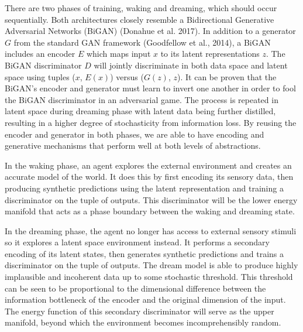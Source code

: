 \documentclass{article}
\begin{document}
There are two phases of training, waking and dreaming, which should occur sequentially. Both architectures closely resemble a Bidirectional Generative Adversarial Networks (BiGAN) (Donahue et al. 2017). In addition to a generator $G$ from the standard GAN framework (Goodfellow et al., 2014), a BiGAN includes an encoder $E$ which maps input $x$ to its latent representations $z$. The BiGAN discriminator $D$  will jointly discriminate in both data space and latent space using tuples ($x$, $E(x)$) versus ($G(z)$, $z$). It can be proven that the BiGAN's encoder and generator must learn to invert one another in order to fool the BiGAN discriminator in an adversarial game. The process is repeated in latent space during dreaming phase with latent data being further distilled, resulting in a higher degree of stochasticity from information loss. By reusing the encoder and generator in both phases, we are able to have encoding and generative mechanisms that perform well at both levels of abstractions. 

In the waking phase, an agent explores the external environment and creates an accurate model of the world. It does this by first encoding its sensory data, then producing synthetic predictions using the latent representation and training a discriminator on the tuple of outputs. This discriminator will be the lower energy manifold that acts as a phase boundary between the waking and dreaming state. 

In the dreaming phase, the agent no longer has access to external sensory stimuli so it explores a latent space environment instead. It performs a secondary encoding of its latent states, then generates synthetic predictions and trains a discriminator on the tuple of outputs. The dream model is able to produce highly implausible and incoherent data up to some stochastic threshold. This threshold can be seen to be proportional to the dimensional difference between the information bottleneck of the encoder and the original dimension of the input. The energy function of this secondary discriminator will serve as the upper manifold, beyond which the environment becomes incomprehensibly random.

\end{document}
